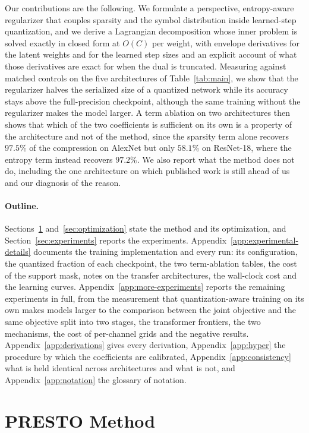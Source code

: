 \documentclass{article}
\begin{document}
Our contributions are the following. We formulate a perspective, entropy-aware
regularizer that couples sparsity and the symbol distribution inside learned-step
quantization, and we derive a Lagrangian decomposition whose inner problem is
solved exactly in closed form at $O(C)$ per weight, with envelope derivatives for
the latent weights and for the learned step sizes and an explicit account of what
those derivatives are exact for when the dual is truncated. Measuring against matched
controls on the five architectures of Table~\ref{tab:main}, we show that the
regularizer halves the
serialized size of a quantized network while its accuracy stays above the
full-precision checkpoint, although the same training without the regularizer
makes the model larger. A term ablation on two architectures then shows that
which of the two coefficients is sufficient on its own is a property of the
architecture and not of the method, since the sparsity term alone recovers
$97.5\%$ of the compression on AlexNet but only $58.1\%$ on ResNet-18, where the
entropy term instead recovers $97.2\%$. We also report what the method does not
do, including the one architecture on which published work is still ahead of us
and our diagnosis of the reason.

\paragraph{Outline.} Sections~\ref{sec:method} and~\ref{sec:optimization} state
the method and its optimization, and Section~\ref{sec:experiments} reports the
experiments. Appendix~\ref{app:experimental-details} documents the training
implementation and every run: its configuration,
the quantized fraction of each checkpoint, the two term-ablation tables, the cost
of the support mask, notes on the transfer architectures, the wall-clock cost and
the learning curves. Appendix~\ref{app:more-experiments} reports the remaining
experiments in full, from the measurement that quantization-aware training on its
own makes models larger to the comparison between the joint objective and the same
objective split into two stages, the transformer frontiers, the two mechanisms,
the cost of per-channel grids and the negative results.
Appendix~\ref{app:derivations} gives every derivation,
Appendix~\ref{app:hyper} the procedure by which the coefficients are calibrated,
Appendix~\ref{app:consistency} what is held identical across architectures and
what is not, and Appendix~\ref{app:notation} the glossary of notation.

\section{PRESTO Method}
\label{sec:method}
\end{document}
